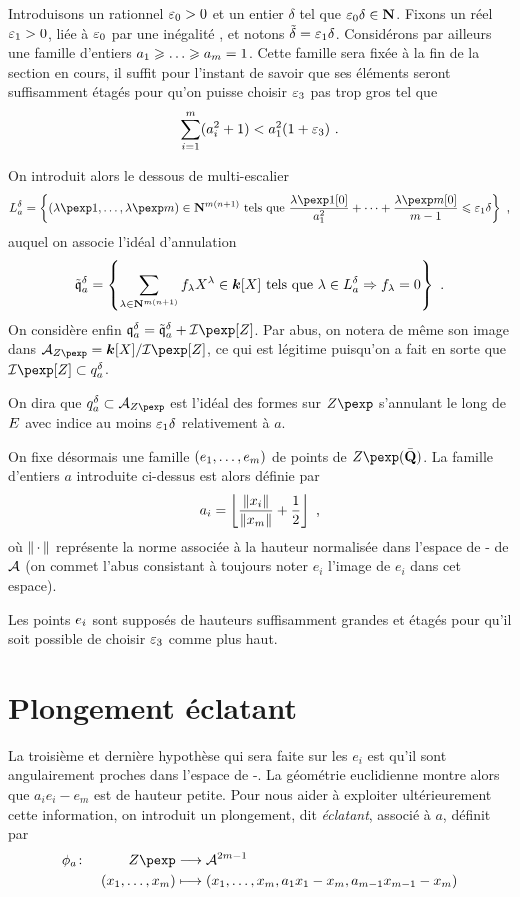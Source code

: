 \documentclass{mpg-preth}
\begin{document}
Introduisons un rationnel $\varepsilon_0 > 0$ et un entier $\delta$ tel que
$\varepsilon_0\delta \in \mathbf{N}$. Fixons un réel $\varepsilon_1 > 0$, liée à $\varepsilon_0$ par une
inégalité , et notons $\tilde\delta =
\varepsilon_1\delta$.
Considérons par ailleurs une famille d'entiers $a_1 \ge \dots \ge a_\puiss =
1$. Cette famille sera fixée à la fin de la section en cours, il suffit pour
l'instant de savoir que ses éléments seront suffisamment étagés pour qu'on
puisse choisir $\varepsilon_3$ pas trop gros \todo[à expliciter] tel que
\[
  \sum_{i=1}^{m} (a_i^2 +1) < a_1^2 (1 + \varepsilon_3) \text{ .}
\]

On introduit alors le dessous de multi-escalier
\[
  L_a^\delta = \left\{
  (\lambda\pexp1, \ldots, \lambda\pexp\puiss) \in \N^{\puiss(\dimp+1)}
  \text{ tels que }
  \frac {\lambda\pexp1[0]} {a_1^2}
  + \dots +
  \frac {\lambda\pexp\puiss[0]} {m-1}
  \le \eps_1 \delta
  \right\}
  \pmm,
\]
auquel on associe l'idéal d'annulation
\[
  \mathfrak{\tilde q}_a^\delta
  = \left\{
  \sum_{\lambda \in \mathbf{N}^{m(n+1)}} f_\lambda X^\lambda \in \boldsymbol{k} [X]
  \text{ tels que }
  \lambda \in L_a^\delta \Rightarrow f_\lambda = 0
  \right\}
  \text{ .}
\]
On considère enfin $\mathfrak{q}_a^\delta = \mathfrak{\tilde q}_a^\delta +
\varid$. Par abus, on notera de même son image dans $\mathcal{A}_{\var} = \cdn
[X] / \varid$, ce qui est légitime puisqu'on a fait en sorte que $\varid
\subset q_a^\delta$.

On dira que $q_a^\delta \subset \mathcal{A}_{\var}$ est l'idéal des formes sur
$\var$ s'annulant le long de $E$ avec indice au moins $\varepsilon_1 \delta$
relativement à $a$.

On fixe désormais une famille $(e_1, \dots, e_m)$ de points de
$\var(\bar\Q)$. La famille d'entiers $a$ introduite ci-dessus est alors définie
par
\[
  a_i = \left\lfloor
  \frac {\left\lVert x_i\right\rVert} {\left\lVert x_m\right\rVert} + \frac12
  \right\rfloor
  \text{ ,}
\]
où $\left\lVert{\,\cdot\,}\right\rVert$ représente la norme associée à la hauteur normalisée dans
l'espace de - de $\mathcal A$ (on commet l'abus consistant à
toujours noter $e_i$ l'image de $e_i$ dans cet espace).

Les points $e_i$ sont supposés de hauteurs suffisamment grandes et étagés
pour qu'il soit possible de choisir $\varepsilon_3$ comme plus haut.

\section{Plongement éclatant}

La troisième et dernière hypothèse qui sera faite sur les $e_i$ est qu'il sont
angulairement proches dans l'espace de -. La géométrie
euclidienne montre alors que $a_i e_i - e_m$ est de hauteur petite. Pour nous
aider à exploiter ultérieurement cette information, on introduit un
plongement, dit \emph{éclatant}, associé à $a$, définit par
\begin{alignat*}{2}
  \phi_a \colon
  && \var
  & \longrightarrow \va^{2\puiss-1}
  \\
  && (x_1, \dots, x_\puiss)
  & \longmapsto (x_1, \dots, x_m, a_1 x_1 - x_m, a_{m-1} x_{m-1} - x_m)
\end{alignat*}
\end{document}
